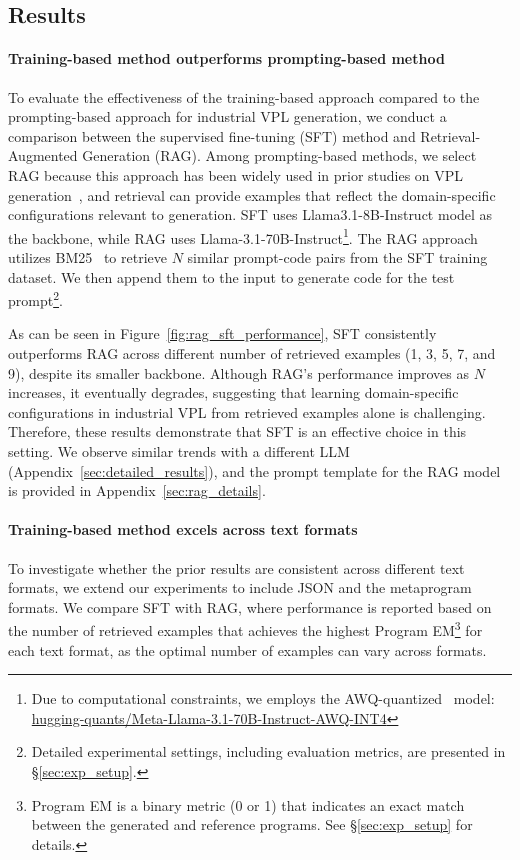 \subsection{Results}\label{sec:sft_res}
\paragraph{Training-based method outperforms prompting-based method}\label{par:sft_rag}
To evaluate the effectiveness of the training-based approach compared to the prompting-based approach for industrial VPL generation, we conduct a comparison between the supervised fine-tuning (SFT) method and Retrieval-Augmented Generation (RAG). Among prompting-based methods, we select RAG because this approach has been widely used in prior studies on VPL generation~\cite{xue2024comfybenchbenchmarkingllmbasedagents,zhang2024benchmarking}, and retrieval can provide examples that reflect the domain-specific configurations relevant to generation. SFT uses Llama3.1-8B-Instruct model as the backbone, while RAG uses Llama-3.1-70B-Instruct\footnote{Due to computational constraints, we employs the AWQ-quantized~\cite{MLSYS2024_42a452cb} model: \href{https://huggingface.co/hugging-quants/Meta-Llama-3.1-70B-Instruct-AWQ-INT4}{hugging-quants/Meta-Llama-3.1-70B-Instruct-AWQ-INT4}}. The RAG approach utilizes BM25~\cite{robertson2009probabilistic} to retrieve \(N\) similar prompt-code pairs from the SFT training dataset. We then append them to the input to generate code for the test prompt\footnote{Detailed experimental settings, including evaluation metrics, are presented in \S\ref{sec:exp_setup}.}.

As can be seen in Figure~\ref{fig:rag_sft_performance}, SFT consistently outperforms RAG across different number of retrieved examples (1, 3, 5, 7, and 9), despite its smaller backbone. Although RAG's performance improves as \(N\) increases, it eventually degrades, suggesting that learning domain-specific configurations in industrial VPL from retrieved examples alone is challenging. Therefore, these results demonstrate that SFT is an effective choice in this setting. We observe similar trends with a different LLM (Appendix~\ref{sec:detailed_results}), and the prompt template for the RAG model is provided in Appendix~\ref{sec:rag_details}. 


\paragraph{Training-based method excels across text formats}\label{par:sft_text_format}
To investigate whether the prior results are consistent across different text formats, we extend our experiments to include JSON and the metaprogram formats. We compare SFT with RAG, where performance is reported based on the number of retrieved examples that achieves the highest Program EM\footnote{Program EM is a binary metric (0 or 1) that indicates an exact match between the generated and reference programs. See \S\ref{sec:exp_setup} for details.} for each text format, as the optimal number of examples can vary across formats. 

